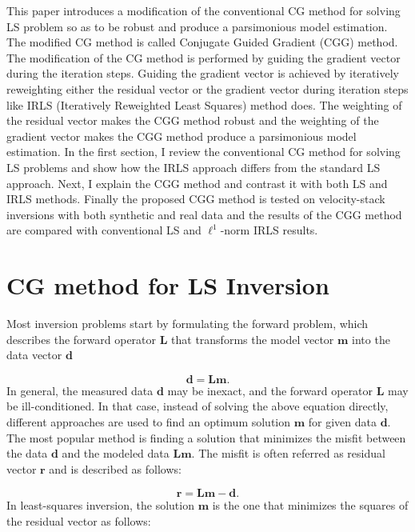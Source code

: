 This paper introduces a modification of the conventional CG method for solving LS problem 
so as to be robust and produce a parsimonious model estimation.
The modified CG method is called Conjugate Guided Gradient (CGG) method.
The modification of the CG method is performed by guiding the gradient vector during the iteration steps.
Guiding the gradient vector is achieved by iteratively reweighting 
either the residual vector or the gradient vector during iteration steps 
like IRLS (Iteratively Reweighted Least Squares) method does.
The weighting of the residual vector makes the CGG method robust
and the weighting of the gradient vector makes the CGG method produce a parsimonious model estimation.
In the first section, I review
the conventional CG method for solving LS problems and
show how the IRLS approach differs from the standard LS approach.
Next, I explain the CGG method and contrast it with both LS and IRLS methods.
Finally the proposed CGG method is tested on velocity-stack inversions
with both synthetic and real data and the results of the CGG method are compared
 with conventional LS and $\ell^1$-norm IRLS results.

\section{CG method for LS Inversion}
Most inversion problems start by formulating the forward problem,
which describes the forward operator $\mathbf L$ 
that transforms the model vector $\mathbf m$ into the data vector $\mathbf d$

\begin{equation}
\mathbf d = \mathbf L \mathbf m .
\end{equation}
In general, the measured data $\mathbf d$ may be inexact, and 
the forward operator $\mathbf L$ may be ill-conditioned. 
In that case, instead of solving the above equation directly, 
different approaches are used to find an optimum solution $\mathbf m$ 
for given data $\mathbf d$.
The most popular method is finding a solution that minimizes the misfit between
the data $\mathbf d$ and the modeled data $\mathbf L\mathbf m$.
The misfit is often referred as residual vector $\mathbf r$ and is described as follows:

\begin{equation}
\mathbf r =  \mathbf L\mathbf m - \mathbf d .
\end{equation}
In least-squares inversion, the solution $\mathbf m$ is the one that minimizes 
the squares of the residual vector as follows:


